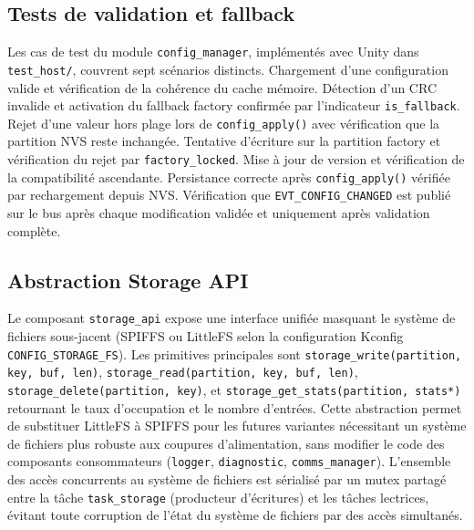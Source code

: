\subsection{Tests de validation et fallback}
\label{subsec:config_tests}

Les cas de test du module \texttt{config\_manager}, implémentés avec
Unity dans \texttt{test\_host/}, couvrent sept scénarios distincts.
Chargement d'une configuration valide et vérification de la cohérence
du cache mémoire. Détection d'un CRC invalide et activation du fallback
factory confirmée par l'indicateur \texttt{is\_fallback}. Rejet d'une
valeur hors plage lors de \texttt{config\_apply()} avec vérification
que la partition NVS reste inchangée. Tentative d'écriture sur la
partition factory et vérification du rejet par \texttt{factory\_locked}.
Mise à jour de version et vérification de la compatibilité ascendante.
Persistance correcte après \texttt{config\_apply()} vérifiée par
rechargement depuis NVS. Vérification que \texttt{EVT\_CONFIG\_CHANGED}
est publié sur le bus après chaque modification validée et uniquement
après validation complète.

\subsection{Abstraction Storage API}
\label{subsec:storage_api}
Le composant \texttt{storage\_api} expose une interface unifiée
masquant le système de fichiers sous-jacent (SPIFFS ou LittleFS selon
la configuration Kconfig \texttt{CONFIG\_STORAGE\_FS}). Les primitives
principales sont \texttt{storage\_write(partition,\allowbreak{} key,\allowbreak{} buf,\allowbreak{} len)},
\texttt{storage\_read(partition,\allowbreak{} key,\allowbreak{} buf,\allowbreak{} len)},
\texttt{storage\_delete(partition,\allowbreak{} key)}, et
\texttt{storage\_get\_stats(partition,\allowbreak{} stats*)} retournant le taux
d'occupation et le nombre d'entrées. Cette abstraction permet de
substituer LittleFS à SPIFFS pour les futures variantes nécessitant
un système de fichiers plus robuste aux coupures d'alimentation, sans
modifier le code des composants consommateurs (\texttt{logger},
\texttt{diagnostic}, \texttt{comms\_manager}). L'ensemble des accès
concurrents au système de fichiers est sérialisé par un mutex partagé
entre la tâche \texttt{task\_storage} (producteur d'écritures) et
les tâches lectrices, évitant toute corruption de l'état du système
de fichiers par des accès simultanés.

